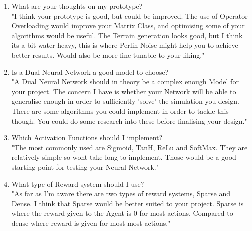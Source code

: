 \begin{flushleft}
            \begin{enumerate}
                \item What are your thoughts on my prototype? \\ 
                    \vspace{0.2cm}
                    "I think your prototype is good, but could be improved. The use of Operator Overloading would improve your Matrix Class,
                    and optimising some of your algorithms would be useful. The Terrain generation looks good, but I think its a bit
                    water heavy, this is where Perlin Noise might help you to achieve better results. Would also be more fine tunable to
                    your liking."

                \item Is a Dual Neural Network a good model to choose? \\
                    \vspace{0.2cm}
                    "A Dual Neural Network should in theory be a complex enough Model for your project. The concern I have is whether your
                    Network will be able to generalise enough in order to sufficiently 'solve' the simulation you design. There are some
                    algorithms you could implement in order to tackle this though. You could do some research into these before finalising 
                    your design."

                \item Which Activation Functions should I implement? \\
                    \vspace{0.2cm}
                    "The most commonly used are Sigmoid, TanH, ReLu and SoftMax. They are relatively simple so wont take long to implement.
                    Those would be a good starting point for testing your Neural Network."
                
                \item What type of Reward system should I use? \\
                    \vspace{0.2cm}
                    "As far as I'm aware there are two types of reward systems, Sparse and Dense. I think that Sparse would be better suited
                    to your project. Sparse is where the reward given to the Agent is 0 for most actions. Compared to dense where reward
                    is given for most most actions."
            \end{enumerate}


\end{flushleft}
